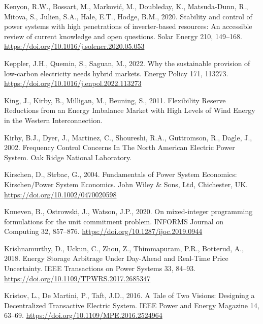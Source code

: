 \documentclass[12pt,a4paper,]{report}
\newlength{\cslhangindent}
\newenvironment{CSLReferences}[2] %
 {%
  \setlength{\parindent}{0pt}
  \ifodd #1 \everypar{\setlength{\hangindent}{\cslhangindent}}\ignorespaces\fi
  \ifnum #2 > 0
  \setlength{\parskip}{#2\baselineskip}
  \fi
 }%
 {}
\begin{document}
\begin{CSLReferences}{1}{0}
\leavevmode{}%
Kenyon, R.W., Bossart, M., Marković, M., Doubleday, K., Matsuda-Dunn,
R., Mitova, S., Julien, S.A., Hale, E.T., Hodge, B.M., 2020. Stability
and control of power systems with high penetrations of inverter-based
resources: {An} accessible review of current knowledge and open
questions. Solar Energy 210, 149--168.
\url{https://doi.org/10.1016/j.solener.2020.05.053}

\leavevmode{}%
Keppler, J.H., Quemin, S., Saguan, M., 2022. Why the sustainable
provision of low-carbon electricity needs hybrid markets. Energy Policy
171, 113273. \url{https://doi.org/10.1016/j.enpol.2022.113273}

\leavevmode{}%
King, J., Kirby, B., Milligan, M., Beuning, S., 2011. Flexibility
{Reserve Reductions} from an {Energy Imbalance Market} with {High
Levels} of {Wind Energy} in the {Western Interconnection}.

\leavevmode{}%
Kirby, B.J., Dyer, J., Martinez, C., Shoureshi, R.A., Guttromson, R.,
Dagle, J., 2002. Frequency {Control Concerns In The North American
Electric Power System}. Oak Ridge National Laboratory.

\leavevmode{}%
Kirschen, D., Strbac, G., 2004. Fundamentals of {Power System
Economics}: {Kirschen}/{Power System Economics}. John Wiley \& Sons,
Ltd, Chichester, UK. \url{https://doi.org/10.1002/0470020598}

\leavevmode{}%
Knueven, B., Ostrowski, J., Watson, J.P., 2020. On mixed-integer
programming formulations for the unit commitment problem. INFORMS
Journal on Computing 32, 857--876.
\url{https://doi.org/10.1287/ijoc.2019.0944}

\leavevmode{}%
Krishnamurthy, D., Uckun, C., Zhou, Z., Thimmapuram, P.R., Botterud, A.,
2018. Energy {Storage Arbitrage Under Day-Ahead} and {Real-Time Price
Uncertainty}. IEEE Transactions on Power Systems 33, 84--93.
\url{https://doi.org/10.1109/TPWRS.2017.2685347}

\leavevmode{}%
Kristov, L., De Martini, P., Taft, J.D., 2016. A {Tale} of {Two
Visions}: {Designing} a {Decentralized Transactive Electric System}.
IEEE Power and Energy Magazine 14, 63--69.
\url{https://doi.org/10.1109/MPE.2016.2524964}


\end{CSLReferences}
\end{document}
